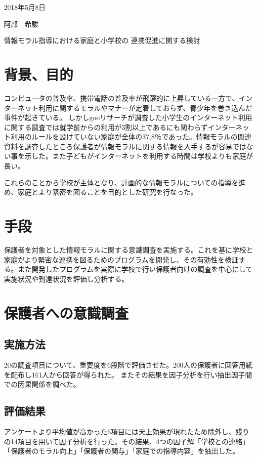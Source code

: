 \documentclass[a4j,11pt]{jsarticle}
\begin{document}
\begin{flushright} %
2018年5月8日

阿部　希駿
\end{flushright}

\begin{center}
\Large{情報モラル指導における家庭と小学校の
連携促進に関する検討}
\end{center}

\section{背景、目的}
\label{sec:mokuteki}
コンピュータの普及率、携帯電話の普及率が飛躍的に上昇している一方で、インターネット利用に関するモラルやマナーが定着しておらず、青少年を巻き込んだ事件が起きている。
しかしgooリサーチが調査した小学生のインターネット利用に関する調査では就学前からの利用が3割以上であるにも関わらずインターネット利用のルールを設けていない家庭が全体の37,8％であった。情報モラルの関連資料を調査したところ保護者が情報モラルに関する情報を入手するが容易ではない事を示した。また子どもがインターネットを利用する時間は学校よりも家庭が長い。

これらのことから学校が主体となり、計画的な情報モラルについての指導を進め、家庭とより緊密を図ることを目的とした研究を行なった。
\section{手段}
\label{sec:kihon}
保護者を対象とした情報モラルに関する意識調査を実施する。これを基に学校と家庭がより緊密な連携を図るためのプログラムを開発し、その有効性を検証する。また開発したプログラムを実際に学校で行い保護者向けの調査を中心にして実施状況や到達状況を評価し分析する。
　

\section{保護者への意識調査}
\subsection{実施方法}
\label{sec:kih}
20の調査項目について、重要度を6段階で評価させた。200人の保護者に回答用紙を配布し161人から回答が得られた。
またその結果を因子分析を行い抽出因子間での因果関係を調べた。

\subsection{評価結果}
アンケートより平均値が高かった6項目には天上効果が現れたため除外し、残りの14項目を用いて因子分析を行った。その結果、4つの因子解「学校との連絡」「保護者のモラル向上」「保護者の関与」「家庭での指導内容」を抽出した。
\end{document}
